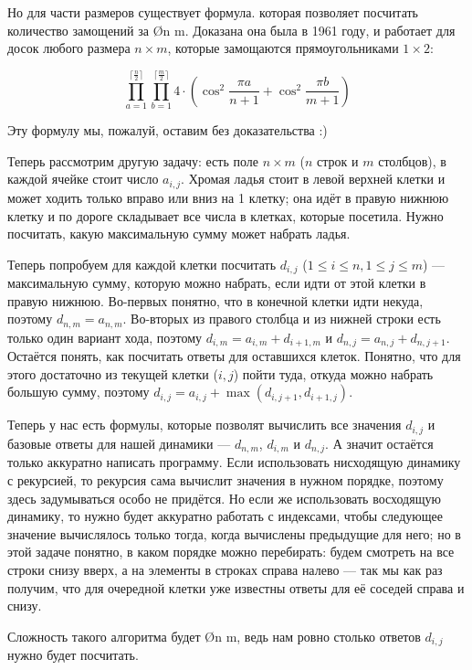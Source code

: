 Но для части размеров существует формула. которая позволяет посчитать количество замощений за \O{n \cdot m}. Доказана она была в 1961 году, и работает для досок любого размера $n \times m$, которые замощаются прямоугольниками $1 \times 2$:

$$\prod\limits_{a=1}^{\lceil {\frac{n}{2}} \rceil} \prod\limits_{b=1}^{\lceil {\frac{m}{2}} \rceil} 4 \cdot \left(\cos^2\frac{\pi a}{n + 1} + \cos^2\frac{\pi b}{m + 1} \right)$$

Эту формулу мы, пожалуй, оставим без доказательства :)


Теперь рассмотрим другую задачу: есть поле $n \times m$ ($n$ строк и $m$ столбцов), в каждой ячейке стоит число $a_{i, j}$. Хромая ладья стоит в левой верхней клетки и может ходить только вправо или вниз на 1 клетку; она идёт в правую нижнюю клетку и по дороге складывает все числа в клетках, которые посетила. Нужно посчитать, какую максимальную сумму может набрать ладья.

Теперь попробуем для каждой клетки посчитать $d_{i, j}$ ($1 \leq i \leq n, 1 \leq j \leq m$)  — максимальную сумму, которую можно набрать, если идти от этой клетки в правую нижнюю. Во-первых понятно, что в конечной клетки идти некуда, поэтому $d_{n, m} = a_{n, m}$. Во-вторых из правого столбца и из нижней строки есть только один вариант хода, поэтому $d_{i, m} = a_{i, m} + d_{i + 1, m}$ и $d_{n, j} = a_{n, j} + d_{n, j + 1}$. Остаётся понять, как посчитать ответы для оставшихся клеток. Понятно, что для этого достаточно из текущей клетки ($i, j$) пойти туда, откуда можно набрать большую сумму, поэтому $d_{i, j} = a_{i, j} + \max(d_{i, j + 1}, d_{i + 1, j})$.

Теперь у нас есть формулы, которые позволят вычислить все значения $d_{i, j}$ и базовые ответы для нашей динамики — $d_{n, m}$, $d_{i, m}$ и $d_{n, j}$. А значит остаётся только аккуратно написать программу. Если использовать нисходящую динамику с рекурсией, то рекурсия сама вычислит значения в нужном порядке, поэтому здесь задумываться особо не придётся. Но если же использовать восходящую динамику, то нужно будет аккуратно работать с индексами, чтобы следующее значение вычислялось только тогда, когда вычислены предыдущие для него; но в этой задаче понятно, в каком порядке можно перебирать: будем смотреть на все строки снизу вверх, а на элементы в строках справа налево — так мы как раз получим, что для очередной клетки уже известны ответы для её соседей справа и снизу.

Сложность такого алгоритма будет \O{n \cdot m}, ведь нам ровно столько ответов $d_{i, j}$ нужно будет посчитать.


